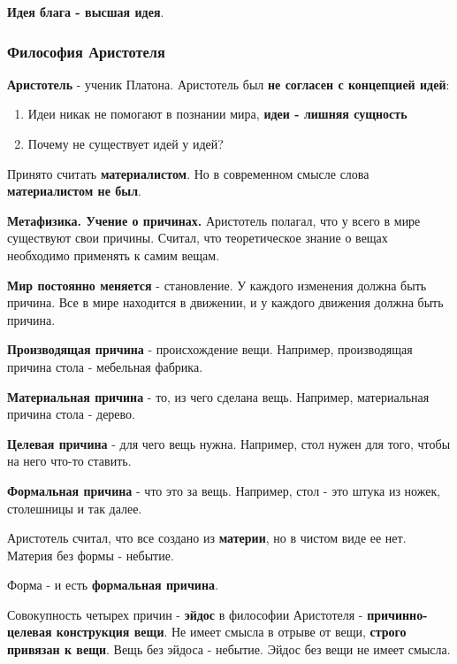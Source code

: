 \documentclass{article}
\begin{document}
\begin{flushleft}
\textbf{Идея блага - высшая идея}.

\subsubsection{Философия Аристотеля}

\textbf{Аристотель} - ученик Платона. Аристотель был \textbf{не согласен с концепцией идей}:

\begin{enumerate}
    \item Идеи никак не помогают в познании мира, \textbf{идеи - лишняя сущность}
    \item Почему не существует идей у идей?
\end{enumerate}

Принято считать \textbf{материалистом}. Но в современном смысле слова \textbf{материалистом не был}.

\hfill

\textbf{Метафизика. Учение о причинах.} Аристотель полагал, что у всего в мире существуют свои причины. Считал, что теоретическое знание о вещах необходимо применять к самим вещам.

\textbf{Мир постоянно меняется} - становление. У каждого изменения должна быть причина. Все в мире находится в движении, и у каждого движения должна быть причина.

\hfill

\textbf{Производящая причина} - происхождение вещи. Например, производящая причина стола - мебельная фабрика.

\textbf{Материальная причина} - то, из чего сделана вещь. Например, материальная причина стола - дерево.

\textbf{Целевая причина} - для чего вещь нужна. Например, стол нужен для того, чтобы на него что-то ставить.

\textbf{Формальная причина} - что это за вещь. Например, стол - это штука из ножек, столешницы и так далее.

\hfill

Аристотель считал, что все создано из \textbf{материи}, но в чистом виде ее нет. Материя без формы - небытие.

Форма - и есть \textbf{формальная причина}.

\hfill

Совокупность четырех причин - \textbf{эйдос} в философии Аристотеля - \textbf{причинно-целевая конструкция вещи}. Не имеет смысла в отрыве от вещи, \textbf{строго привязан к вещи}. Вещь без эйдоса - небытие. Эйдос без вещи не имеет смысла.


\end{flushleft}
\end{document}
